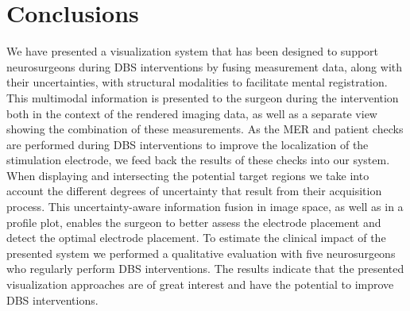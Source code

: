 \documentclass{egpubl}
\begin{document}
\section{Conclusions}\label{sec:conclusions}
We have presented a visualization system that has been designed to support neurosurgeons during DBS interventions by fusing measurement data, along with their uncertainties, with structural modalities to facilitate mental registration. This multimodal information is presented to the surgeon during the intervention both in the context of the rendered imaging data, as well as a separate view showing the combination of these measurements. As the MER and patient checks are performed during DBS interventions to improve the localization of the stimulation electrode, we feed back the results of these checks into our system. When displaying and intersecting the potential target regions we take into account the different degrees of uncertainty that result from their acquisition process. This uncertainty-aware information fusion in image space, as well as in a profile plot, enables the surgeon to better assess the electrode placement and detect the optimal electrode placement. To estimate the clinical impact of the presented system we performed a qualitative evaluation with five neurosurgeons who regularly perform DBS interventions. The results indicate that the presented visualization approaches are of great interest and have the potential to improve DBS interventions.
%



\end{document}
